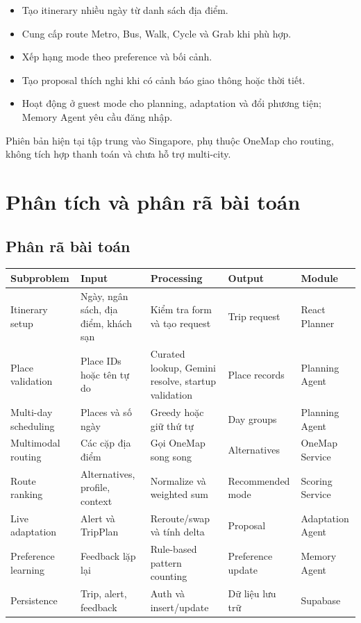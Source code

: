 \documentclass[12pt,a4paper]{article}
\begin{document}
\begin{itemize}
    \item Tạo itinerary nhiều ngày từ danh sách địa điểm.
    \item Cung cấp route Metro, Bus, Walk, Cycle và Grab khi phù hợp.
    \item Xếp hạng mode theo preference và bối cảnh.
    \item Tạo proposal thích nghi khi có cảnh báo giao thông hoặc thời tiết.
    \item Hoạt động ở guest mode cho planning, adaptation và đổi phương tiện; Memory Agent yêu cầu đăng nhập.
\end{itemize}

Phiên bản hiện tại tập trung vào Singapore, phụ thuộc OneMap cho routing, không tích hợp thanh toán và chưa hỗ trợ multi-city.

\section{Phân tích và phân rã bài toán}

\subsection{Phân rã bài toán}


\begin{longtable}{|L{2.8cm}|L{2.8cm}|L{4.2cm}|L{2.5cm}|L{2.5cm}|}
\hline
\textbf{Subproblem} & \textbf{Input} & \textbf{Processing} & \textbf{Output} & \textbf{Module} \\ \hline
\endhead
Itinerary setup & Ngày, ngân sách, địa điểm, khách sạn & Kiểm tra form và tạo request & Trip request & React Planner \\ \hline
Place validation & Place IDs hoặc tên tự do & Curated lookup, Gemini resolve, startup validation & Place records & Planning Agent \\ \hline
Multi-day scheduling & Places và số ngày & Greedy hoặc giữ thứ tự & Day groups & Planning Agent \\ \hline
Multimodal routing & Các cặp địa điểm & Gọi OneMap song song & Alternatives & OneMap Service \\ \hline
Route ranking & Alternatives, profile, context & Normalize và weighted sum & Recommended mode & Scoring Service \\ \hline
Live adaptation & Alert và TripPlan & Reroute/swap và tính delta & Proposal & Adaptation Agent \\ \hline
Preference learning & Feedback lặp lại & Rule-based pattern counting & Preference update & Memory Agent \\ \hline
Persistence & Trip, alert, feedback & Auth và insert/update & Dữ liệu lưu trữ & Supabase \\ \hline
\end{longtable}
\end{document}
